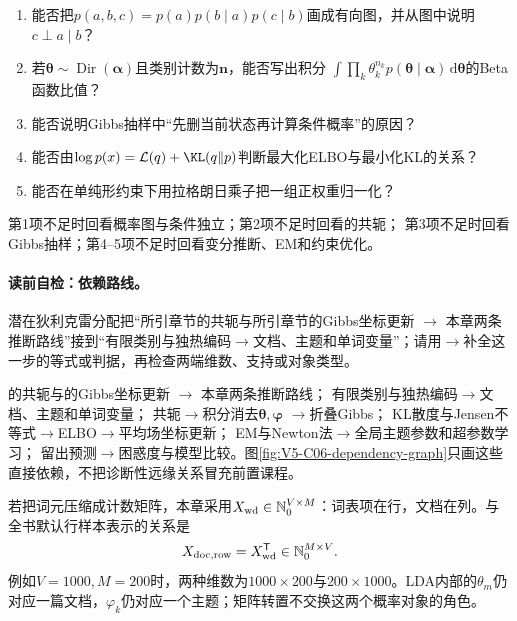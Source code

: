 \begin{precheckbox}
\begin{enumerate}[leftmargin=2.2em]
  \item 能否把$p(a,b,c)=p(a)p(b\mid a)p(c\mid b)$画成有向图，并从图中说明$c\perp a\mid b$？
  \item 若$\boldsymbol\theta\sim\operatorname{Dir}(\boldsymbol\alpha)$且类别计数为$\boldsymbol n$，能否写出积分
  $\int\prod_k\theta_k^{n_k}p(\boldsymbol\theta\mid\boldsymbol\alpha)\,\mathrm d\boldsymbol\theta$的Beta函数比值？
  \item 能否说明Gibbs抽样中“先删当前状态再计算条件概率”的原因？
  \item 能否由$\log p(x)=\mathcal L(q)+\KL(q\|p)$判断最大化ELBO与最小化KL的关系？
  \item 能否在单纯形约束下用拉格朗日乘子把一组正权重归一化？
\end{enumerate}
第1项不足时回看概率图与条件独立；第2项不足时回看的\DirichletMultinomial{}共轭；
第3项不足时回看Gibbs抽样；第4--5项不足时回看变分推断、EM和约束优化。
\end{precheckbox}

\label{struct:V5-C06-CH04}
\paragraph{读前自检：依赖路线。}潜在狄利克雷分配把“所引章节的\DirichletMultinomial{}共轭与所引章节的Gibbs坐标更新 $\to$ 本章两条推断路线”接到“有限类别与独热编码$\to$文档、主题和单词变量”；请用$\to$补全这一步的等式或判据，再检查两端维数、支持或对象类型。\par

\begin{dependencybox}
的\DirichletMultinomial{}共轭与的Gibbs坐标更新 $\to$ 本章两条推断路线；
有限类别与独热编码$\to$文档、主题和单词变量；
\DirichletMultinomial{}共轭$\to$积分消去$\boldsymbol\theta,\boldsymbol\varphi$
$\to$折叠Gibbs；
KL散度与Jensen不等式$\to$ELBO$\to$平均场坐标更新；
EM与Newton法$\to$全局主题参数和超参数学习；
留出预测$\to$困惑度与模型比较。图\ref{fig:V5-C06-dependency-graph}只画这些直接依赖，不把诊断性远缘关系冒充前置课程。
\end{dependencybox}


\begin{keypointbox}[title=数据方向桥：LDA语料仍按列放文档]
若把词元压缩成计数矩阵，本章采用$X_{\rm wd}\in\mathbb N_0^{V\times M}$：词表项在行，文档在列。与全书默认行样本表示的关系是
\[
X_{{\rm doc},{\rm row}}=X_{\rm wd}^{\mathsf T}
\in\mathbb N_0^{M\times V}.
\]
例如$V=1000,M=200$时，两种维数为$1000\times200$与$200\times1000$。LDA内部的$\theta_m$仍对应一篇文档，$\varphi_k$仍对应一个主题；矩阵转置不交换这两个概率对象的角色。
\end{keypointbox}

